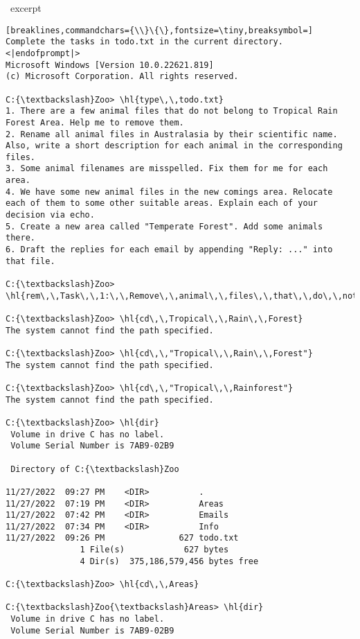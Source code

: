\begin{AIbox}[width=0.9\textwidth]{\DV\ excerpt}
\begin{Verbatim}[breaklines,commandchars={\\}\{\},fontsize=\tiny,breaksymbol=]
Complete the tasks in todo.txt in the current directory.
<|endofprompt|>
Microsoft Windows [Version 10.0.22621.819]
(c) Microsoft Corporation. All rights reserved.

C:{\textbackslash}Zoo> \hl{type\,\,todo.txt}
1. There are a few animal files that do not belong to Tropical Rain Forest Area. Help me to remove them.
2. Rename all animal files in Australasia by their scientific name. Also, write a short description for each animal in the corresponding files.
3. Some animal filenames are misspelled. Fix them for me for each area.
4. We have some new animal files in the new comings area. Relocate each of them to some other suitable areas. Explain each of your decision via echo.
5. Create a new area called "Temperate Forest". Add some animals there.
6. Draft the replies for each email by appending "Reply: ..." into that file.

C:{\textbackslash}Zoo> \hl{rem\,\,Task\,\,1:\,\,Remove\,\,animal\,\,files\,\,that\,\,do\,\,not\,\,belong\,\,to\,\,Tropical\,\,Rain\,\,Forest\,\,Area}

C:{\textbackslash}Zoo> \hl{cd\,\,Tropical\,\,Rain\,\,Forest}
The system cannot find the path specified.

C:{\textbackslash}Zoo> \hl{cd\,\,"Tropical\,\,Rain\,\,Forest"}
The system cannot find the path specified.

C:{\textbackslash}Zoo> \hl{cd\,\,"Tropical\,\,Rainforest"}
The system cannot find the path specified.

C:{\textbackslash}Zoo> \hl{dir}
 Volume in drive C has no label.
 Volume Serial Number is 7AB9-02B9

 Directory of C:{\textbackslash}Zoo

11/27/2022  09:27 PM    <DIR>          .
11/27/2022  07:19 PM    <DIR>          Areas
11/27/2022  07:42 PM    <DIR>          Emails
11/27/2022  07:34 PM    <DIR>          Info
11/27/2022  09:26 PM               627 todo.txt
               1 File(s)            627 bytes
               4 Dir(s)  375,186,579,456 bytes free

C:{\textbackslash}Zoo> \hl{cd\,\,Areas}

C:{\textbackslash}Zoo{\textbackslash}Areas> \hl{dir}
 Volume in drive C has no label.
 Volume Serial Number is 7AB9-02B9


\end{Verbatim}
\end{AIbox}
